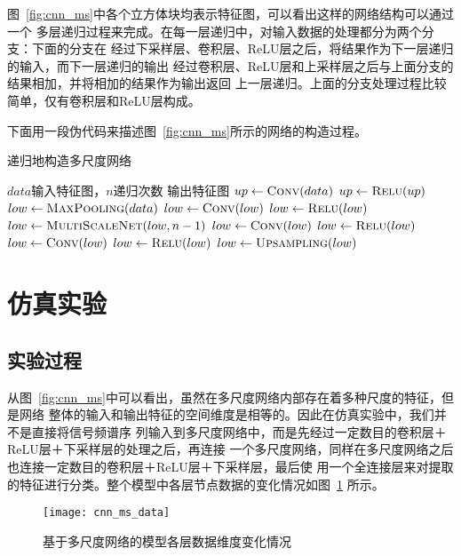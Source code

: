 图~\ref{fig:cnn_ms}中各个立方体块均表示特征图，可以看出这样的网络结构可以通过一个
多层递归过程来完成。在每一层递归中，对输入数据的处理都分为两个分支：下面的分支在
经过下采样层、卷积层、ReLU层之后，将结果作为下一层递归的输入，而下一层递归的输出
经过卷积层、ReLU层和上采样层之后与上面分支的结果相加，并将相加的结果作为输出返回
上一层递归。上面的分支处理过程比较简单，仅有卷积层和ReLU层构成。

下面用一段伪代码来描述图~\ref{fig:cnn_ms}所示的网络的构造过程。

\begin{algorithm}[ht]
    \caption{递归地构造多尺度网络}
    \begin{algorithmic}[1] %
        \Require $data$输入特征图，$n$递归次数
        \Ensure 输出特征图
						\State $up \gets \Call{Conv}{data}$
            \State $up \gets \Call{Relu}{up}$
            \State $low \gets \Call{MaxPooling}{data}$
            \State $low \gets \Call{Conv}{low}$
            \State $low \gets \Call{Relu}{low}$
                \State $low \gets \Call{MultiScaleNet}{low, n-1}$
						\Else
							\State $low \gets \Call{Conv}{low}$
							\State $low \gets \Call{Relu}{low}$
            \EndIf
						\State $low \gets \Call{Conv}{low}$
						\State $low \gets \Call{Relu}{low}$
						\State $low \gets \Call{Upsampling}{low}$
            \State {}
        \EndFunction
    \end{algorithmic}
\end{algorithm}

\section{仿真实验}

\subsection{实验过程}

从图~\ref{fig:cnn_ms}中可以看出，虽然在多尺度网络内部存在着多种尺度的特征，但是网络
整体的输入和输出特征的空间维度是相等的。因此在仿真实验中，我们并不是直接将信号频谱序
列输入到多尺度网络中，而是先经过一定数目的卷积层＋ReLU层＋下采样层的处理之后，再连接
一个多尺度网络，同样在多尺度网络之后也连接一定数目的卷积层＋ReLU层＋下采样层，最后使
用一个全连接层来对提取的特征进行分类。整个模型中各层节点数据的变化情况如图~\ref{fig:cnn_ms_data}
所示。
\begin{figure}[ht]
  \centering
  \texttt{[image: cnn\_ms\_data]}
  \caption{基于多尺度网络的模型各层数据维度变化情况}
  \label{fig:cnn_ms_data}
\end{figure}

